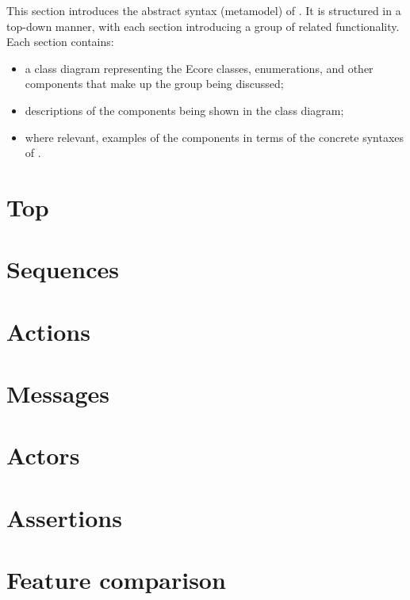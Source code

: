 

This section introduces the abstract syntax (metamodel) of \langname.
It is structured in a top-down manner, with each section introducing a group of
related \langname{} functionality.  Each section contains:

\begin{itemize}
\item
	a class diagram representing the Ecore classes, enumerations, and other
	components that make up the group being discussed;
\item
	descriptions of the components being shown in the class diagram;
\item
	where relevant, examples of the components in terms of the concrete
	syntaxes of \langname.
\end{itemize}


\section{Top}\label{sec:metamodel-top}


\section{Sequences}\label{sec:metamodel-sequences}


\section{Actions}\label{sec:metamodel-actions}


\section{Messages}\label{sec:metamodel-messages}


\section{Actors}\label{sec:metamodel-actors}


\section{Assertions}\label{sec:metamodel-assertions}


\section{Feature comparison}\label{sec:metamodel-features}


